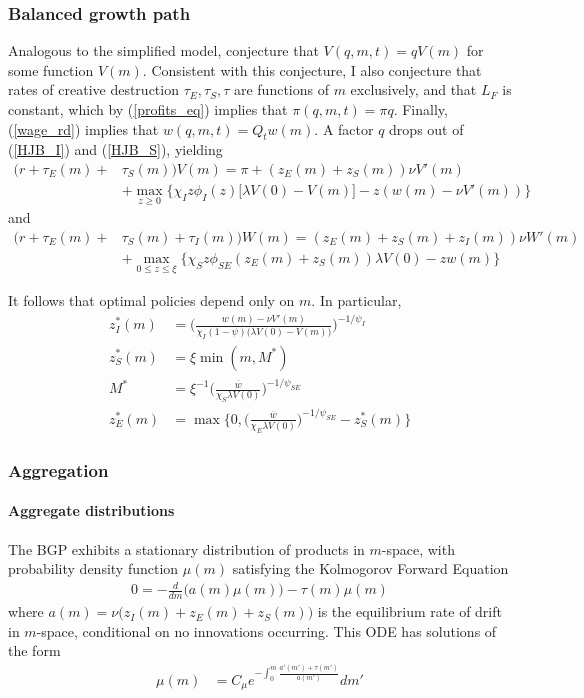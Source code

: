 \documentclass[11pt,english]{article}
\theoremstyle{remark}
\begin{document}
\subsubsection{Balanced growth path}

Analogous to the simplified model, conjecture that $V(q,m,t) = q V(m)$ for some function $V(m)$. Consistent with this conjecture, I also conjecture that rates of creative destruction $\tau_E,\tau_S,\tau$ are functions of $m$ exclusively, and that $L_F$ is constant, which by (\ref{profits_eq}) implies that $\pi(q,m,t) = \pi q$. Finally, (\ref{wage_rd}) implies that $w(q,m,t) = Q_t w(m)$. A factor $q$ drops out of (\ref{HJB_I}) and (\ref{HJB_S}), yielding
\begin{align}
(r + \tau_E(m) + &\tau_S(m)) V(m) = \pi + (z_E(m) + z_S(m))\nu V'(m) \nonumber \\
       &+ \max_{z \ge 0} \Big\{  \chi_I z \phi_I(z) \Big[\lambda V(0) - V(m) \Big] - z (w(m) - \nu V'(m)  ) \Big\} \label{BGP_HJB_I}
\end{align} 
and
\begin{align}
(r + \tau_E(m) + &\tau_S(m) + \tau_I(m))W(m) = (z_E(m) + z_S(m) + z_I(m)) \nu W'(m) \nonumber \\
		&+ \max_{0 \le z \le \xi} \Big\{  \chi_S z \phi_{SE}(z_E(m) + z_S(m)) \lambda V(0) - z w(m) \Big\} \label{BGP_HJB_S} 
\end{align}

It follows that optimal policies depend only on $m$. In particular,
\begin{align}
	z_I^*(m) &= \Bigg( \frac{w(m) - \nu V'(m)}{\chi_I (1-\psi) \Big(\lambda V(0) - V(m) \Big)} \Bigg)^{-1/\psi_I} \\
	z_S^*(m) &= \xi \min(m,M^*) \\
	M^* &= \xi^{-1}\Big(\frac{\overline{w}}{\chi_S \lambda V(0)} \Big)^{-1 / \psi_{SE}}\\
	z_E^*(m) &= \max \Bigg\{0, \Big(\frac{\overline{w}}{\chi_E \lambda V(0)} \Big)^{-1 / \psi_{SE}} - z_S^*(m)\Bigg\}
\end{align}

\subsubsection{Aggregation}\label{full_model_aggregation}

\paragraph{Aggregate distributions} The BGP exhibits a stationary distribution of products in $m$-space, with probability density function $\mu(m)$ satisfying the Kolmogorov Forward Equation
\begin{align}
	0 = - \frac{d}{dm} \Big( a(m) \mu(m) \Big) - \tau(m) \mu(m)  \label{KF_equation}
\end{align}
where $a(m) = \nu \Big( z_I(m) + z_E(m) + z_S(m)\Big)$ is the equilibrium rate of drift in $m$-space, conditional on no innovations occurring. This ODE has solutions of the form
\begin{align}
	\mu(m) &= C_\mu e^{-\int_0^m \frac{a'(m') + \tau(m')}{a(m')}} dm' \label{KF_solution_1}
\end{align}
\end{document}
